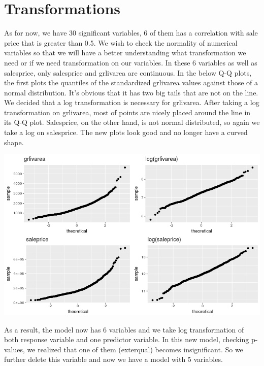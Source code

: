 \documentclass[12pt]{article}
\begin{document}
\begin{flushleft}
\begin{samepage}
\end{samepage}
\centering
\section{Transformations}
\begin{flushleft}

As for now, we have 30 significant variables, 6 of them has a correlation with sale price that is greater than 0.5. We wish to check the normality of numerical variables so that we will have a better understanding what transformation we need or if we need transformation on our variables. In these 6 variables as well as salesprice, only salesprice and grlivarea are continuous. In the below Q-Q plots, the first plots the quantiles of the standardized grlivarea values against those of a normal distribution. It’s obvious that it has two big tails that are not on the line. We decided that a log transformation is necessary for grlivarea. After taking a log transformation on grlivarea, most of points are nicely placed around the line in its Q-Q plot. Salesprice, on the other hand, is not normal distributed, so again we take a log on salesprice. The new plots look good and no longer have a curved shape.

\end{flushleft}
\centering
    \vspace*{0.5 cm}
    \includegraphics[scale = .5]{qq.png}\\[1.0 cm]	
\begin{flushleft}

As a result, the model now has 6 variables and we take log transformation of both response variable and one predictor variable. In this new model, checking p-values, we realized that one of them (exterqual) becomes insignificant. So we further delete this variable and now we have a model with 5 variables.


\end{flushleft}
\end{flushleft}
\end{document}
